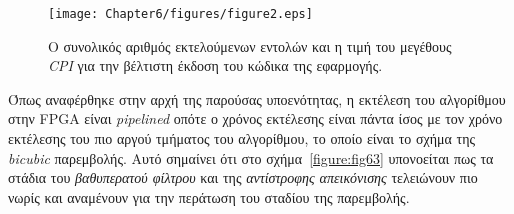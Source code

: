 \begin{figure}[b]
\centering
\texttt{[image: Chapter6/figures/figure2.eps]}
\caption{\label{figure:fig62}O συνολικός αριθμός εκτελούμενων εντολών και η τιμή του μεγέθους \textsl{CPI} για την βέλτιστη έκδοση του κώδικα της εφαρμογής.}
\end{figure}
Όπως αναφέρθηκε στην αρχή της παρούσας υποενότητας, η εκτέλεση του αλγορίθμου στην \ac{FPGA} είναι \textsl{pipelined} οπότε ο χρόνος εκτέλεσης είναι πάντα ίσος με τον χρόνο εκτέλεσης του πιο αργού τμήματος του αλγορίθμου, το οποίο είναι το σχήμα της \textsl{bicubic} παρεμβολής. Αυτό σημαίνει ότι στο σχήμα~\ref{figure:fig63} υπονοείται πως τα στάδια του \textsl{βαθυπερατού φίλτρου} και της \textsl{αντίστροφης απεικόνισης} τελειώνουν πιο νωρίς και αναμένουν για την περάτωση του σταδίου της παρεμβολής.

